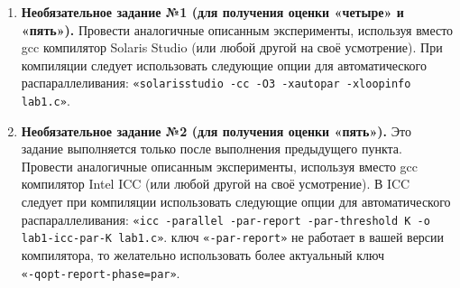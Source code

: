 {\begin{enumerate}
\begin{itemize}
				 lab1-par-K для значений \\$N\;=\;{N1,\;N1+\Delta,\;N1+2\Delta,\;N1+3\Delta,…,\;N2}$ и записывать получающиеся значения времени delta\textunderscore ms(N) в функцию $par-K(N)$;
				 $\Delta$ выбрать так: $\Delta\;=\;(N2\;-\;N1)/10$.
			\end{itemize}
		 отчёт о проделанной работе.
		 к устным вопросам на защите.
		 вычислительную сложность алгоритма до и после распараллеливания, сравнить полученные результаты.
		\sloppy
		\item\textbf{Необязательное задание №1 (для получения оценки «четыре» и «пять»).} Провести аналогичные описанным эксперименты, используя вместо gcc компилятор Solaris Studio (или любой другой на своё усмотрение). При компиляции следует использовать следующие опции для автоматического распараллеливания: \verb+«solarisstudio -cc -O3 -xautopar -xloopinfo lab1.c»+.
 		\item\textbf{Необязательное задание №2 (для получения оценки «пять»).} Это задание выполняется только после выполнения предыдущего пункта. Провести аналогичные описанным эксперименты, используя вместо gcc компилятор Intel ICC (или любой другой на своё усмотрение). В ICC следует при компиляции использовать следующие опции для автоматического распараллеливания: \verb+«icc -parallel -par-report -par-threshold K -o lab1-icc-par-K lab1.c»+.
			 ключ \verb+«-par-report»+ не работает в вашей версии компилятора, то желательно использовать более актуальный ключ \\\verb+«-qopt-report-phase=par»+.
	\end{enumerate}
	
}